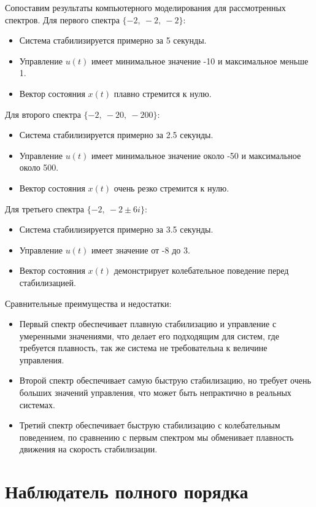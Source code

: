 Сопоставим результаты компьютерного моделирования для рассмотренных спектров.
Для первого спектра $\{-2,\ -2,\ -2\}$:
\begin{itemize}
    \item Система стабилизируется примерно за 5 секунды.
    \item Управление $u(t)$ имеет минимальное значение -10 и максимальное меньше 1.
    \item Вектор состояния $x(t)$ плавно стремится к нулю.
\end{itemize}
Для второго спектра $\{-2,\ -20,\ -200\}$:
\begin{itemize}
    \item Система стабилизируется примерно за 2.5 секунды.
    \item Управление $u(t)$ имеет минимальное значение около -50 и максимальное около 500.
    \item Вектор состояния $x(t)$ очень резко стремится к нулю.
\end{itemize}
Для третьего спектра $\{-2,\ -2\pm 6i\}$:
\begin{itemize}
    \item Система стабилизируется примерно за 3.5 секунды.
    \item Управление $u(t)$ имеет значение от -8 до 3.
    \item Вектор состояния $x(t)$ демонстрирует колебательное поведение перед стабилизацией.
\end{itemize}
Сравнительные преимущества и недостатки:
\begin{itemize}
    \item Первый спектр обеспечивает плавную стабилизацию и управление 
    с умеренными значениями, что делает его подходящим для систем, где требуется
    плавность, так же система не требовательна к величине управления.
    \item Второй спектр обеспечивает самую быструю стабилизацию, но требует очень 
    больших значений управления, что может быть непрактично в реальных системах.
    \item Третий спектр обеспечивает быструю стабилизацию с колебательным поведением, 
    по сравнению с первым спектром мы обменивает плавность движения на скорость стабилизации.
\end{itemize}



\section{Наблюдатель полного порядка}

